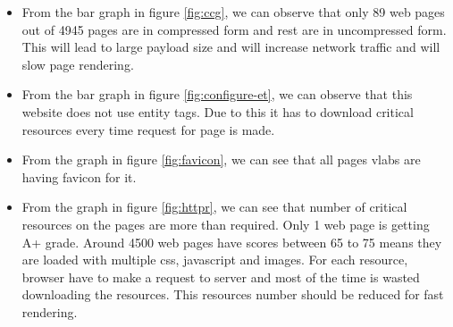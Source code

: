 \documentclass[conference]{IEEEtran}
\begin{document}
\begin{itemize}
\item From the bar graph in figure \ref{fig:ccg}, we can observe that only 89 web pages out of 4945
pages are in compressed form and rest are in uncompressed form. This will lead to
large payload size and will increase network traffic and will slow page
rendering.

\item From the bar graph in figure \ref{fig:configure-et}, we can observe that this website does not use entity
tags. Due to this it has to download critical resources every time request for page is made.

\item From the graph in figure \ref{fig:favicon}, we can see that all pages vlabs are having favicon for it.

\item From the graph in figure \ref{fig:httpr}, we can see that number of critical resources on the pages
are more than required. Only 1 web page is getting A+ grade. Around 4500 web pages
have scores between 65 to 75 means they are loaded with multiple css, javascript
and images. For each resource, browser have to make a request to server and most
of the time is wasted downloading the resources. This resources  number should be
reduced for fast rendering.
\end{itemize}
\end{document}
